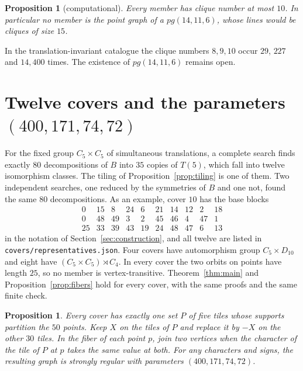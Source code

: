 \documentclass[11pt]{amsart}
\newtheorem{proposition}[theorem]{Proposition}
\theoremstyle{remark}
\begin{document}
\begin{proposition}[computational]
Every member has clique number at most $10$. In particular no member is the point graph of a $pg(14,11,6)$, whose lines would be cliques of size $15$.
\end{proposition}

In the translation-invariant catalogue the clique numbers $8,9,10$ occur $29$, $227$ and $14{,}400$ times. The existence of $pg(14,11,6)$ remains open.

\section{Twelve covers and the parameters \texorpdfstring{$(400,171,74,72)$}{(400,171,74,72)}}\label{sec:covers}

For the fixed group $C_5\times C_5$ of simultaneous translations, a complete search finds exactly $80$ decompositions of $B$ into $35$ copies of $T(5)$, which fall into twelve isomorphism classes. The tiling of Proposition~\ref{prop:tiling} is one of them. Two independent searches, one reduced by the symmetries of $B$ and one not, found the same $80$ decompositions. As an example, cover $10$ has the base blocks
\[
\begin{array}{rrrrrrrrrr}
0&15&8&24&6&21&14&12&2&18\\
0&48&49&3&2&45&46&4&47&1\\
25&33&39&43&19&24&48&47&6&13
\end{array}
\]
in the notation of Section~\ref{sec:construction}, and all twelve are listed in \texttt{covers/representatives.json}. Four covers have automorphism group $C_5\times D_{10}$ and eight have $(C_5\times C_5)\rtimes C_4$. In every cover the two orbits on points have length $25$, so no member is vertex-transitive. Theorem~\ref{thm:main} and Proposition~\ref{prop:fibers} hold for every cover, with the same proofs and the same finite check.

\begin{proposition}\label{prop:171}
Every cover has exactly one set $P$ of five tiles whose supports partition the $50$ points. Keep $X$ on the tiles of $P$ and replace it by $-X$ on the other $30$ tiles. In the fiber of each point $p$, join two vertices when the character of the tile of $P$ at $p$ takes the same value at both. For any characters and signs, the resulting graph is strongly regular with parameters $(400,171,74,72)$.
\end{proposition}
\end{document}
